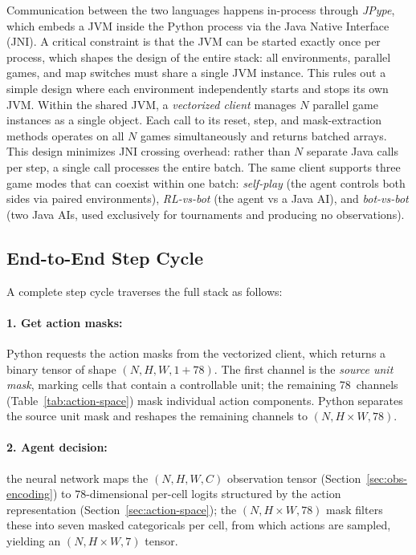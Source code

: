 Communication between the two languages happens in-process through \emph{JPype}, which embeds a JVM inside the Python process via the Java Native Interface (JNI). A critical constraint is that the JVM can be started exactly once per process, which shapes the design of the entire stack: all environments, parallel games, and map switches must share a single JVM instance. This rules out a simple design where each environment independently starts and stops its own JVM. Within the shared JVM, a \emph{vectorized client} manages $N$ parallel game instances as a single object. Each call to its reset, step, and mask-extraction methods operates on all $N$ games simultaneously and returns batched arrays. This design minimizes JNI crossing overhead: rather than $N$ separate Java calls per step, a single call processes the entire batch. The same client supports three game modes that can coexist within one batch: \emph{self-play} (the agent controls both sides via paired environments), \emph{RL-vs-bot} (the agent vs a Java AI), and \emph{bot-vs-bot} (two Java AIs, used exclusively for tournaments and producing no observations).

\subsection{End-to-End Step Cycle}
\label{subsec:full-step-pipeline}

A complete step cycle traverses the full stack as follows:

\paragraph*{1. Get action masks:} Python requests the action masks from the vectorized client, which returns a binary tensor of shape $(N, H, W, 1 + 78)$. The first channel is the \emph{source unit mask}, marking cells that contain a controllable unit; the remaining 78~channels (Table~\ref{tab:action-space}) mask individual action components. Python separates the source unit mask and reshapes the remaining channels to $(N, H{\times}W, 78)$.

\paragraph*{2. Agent decision:} the neural network maps the $(N, H, W, C)$ observation tensor (Section~\ref{sec:obs-encoding}) to $78$-dimensional per-cell logits structured by the action representation (Section~\ref{sec:action-space}); the $(N, H{\times}W, 78)$ mask filters these into seven masked categoricals per cell, from which actions are sampled, yielding an $(N, H{\times}W, 7)$ tensor.


